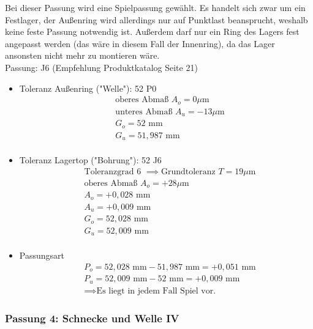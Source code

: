 Bei dieser Passung wird eine Spielpassung gewählt. Es handelt sich zwar um ein Festlager, der Außenring wird allerdings nur auf Punktlast beansprucht, weshalb keine feste Passung notwendig ist. Außerdem darf nur ein Ring des Lagers fest angepasst werden (das wäre in diesem Fall der Innenring), da das Lager ansonsten nicht mehr zu montieren wäre. \\ 
Passung: J6 (Empfehlung Produktkatalog Seite 21)
\begin{itemize}
	\item Toleranz Außenring ("Welle"): 52 P0 
	\begin{align*}
	&\text{oberes Abmaß } A_o = 0 \mu\text{m} \\
	&\text{unteres Abmaß } A_u = -13 \mu\text{m} \\
	&G_o = 52 \text{ mm} \\
	&G_u = 51,987 \text{ mm}\\
	\end{align*} 
	\item Toleranz Lagertop ("Bohrung"): 52 J6
	\begin{align*}
	&\text{Toleranzgrad 6 } \implies \text{Grundtoleranz } T=19 \mu\text{m} \\
	&\text{oberes Abmaß } A_o = +28 \mu\text{m} \\
	&A_o = +0,028 \text{ mm} \\
	&A_u = +0,009 \text{ mm} \\
	&G_o = 52,028 \text{ mm} \\
	&G_u = 52,009 \text{ mm}\\
	\end{align*} 
	\item Passungsart
	\begin{align*}
	&P_o = 52,028 \text{ mm} - 51,987 \text{ mm} = +0,051 \text{ mm} \\
	&P_u =52,009 \text{ mm} - 52 \text{ mm} = +0,009 \text{ mm}\\
	&\implies \text{Es liegt in jedem Fall Spiel vor.}
	\end{align*} 
\end{itemize}
\newpage

\subsubsection{Passung 4: Schnecke und Welle IV}

